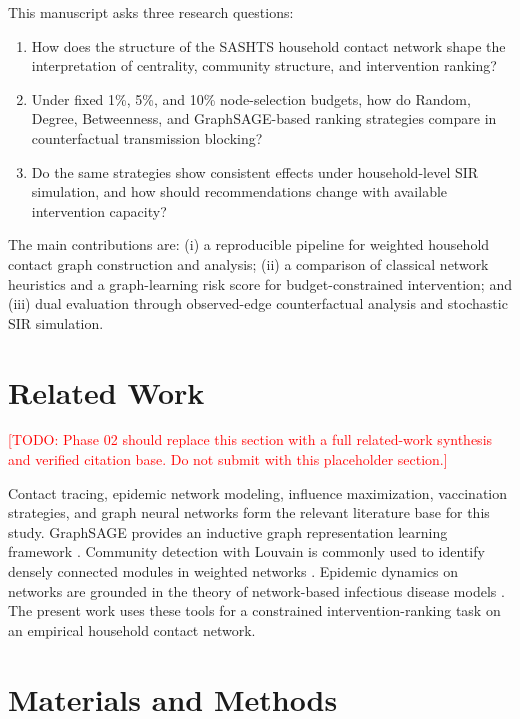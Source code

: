 \documentclass[11pt,a4paper]{article}
\newcommand{\TODO}[1]{\textcolor{red}{[TODO: #1]}}
\begin{document}
This manuscript asks three research questions:

\begin{enumerate}
  \item How does the structure of the SASHTS household contact network shape the interpretation of centrality, community structure, and intervention ranking?
  \item Under fixed 1\%, 5\%, and 10\% node-selection budgets, how do Random, Degree, Betweenness, and GraphSAGE-based ranking strategies compare in counterfactual transmission blocking?
  \item Do the same strategies show consistent effects under household-level SIR simulation, and how should recommendations change with available intervention capacity?
\end{enumerate}

The main contributions are: (i) a reproducible pipeline for weighted household contact graph construction and analysis; (ii) a comparison of classical network heuristics and a graph-learning risk score for budget-constrained intervention; and (iii) dual evaluation through observed-edge counterfactual analysis and stochastic SIR simulation.

\section{Related Work}

\TODO{Phase 02 should replace this section with a full related-work synthesis and verified citation base. Do not submit with this placeholder section.}

Contact tracing, epidemic network modeling, influence maximization, vaccination strategies, and graph neural networks form the relevant literature base for this study. GraphSAGE provides an inductive graph representation learning framework \cite{hamilton2017graphsage}. Community detection with Louvain is commonly used to identify densely connected modules in weighted networks \cite{blondel2008louvain}. Epidemic dynamics on networks are grounded in the theory of network-based infectious disease models \cite{kiss2017epidemics,keeling2005networks}. The present work uses these tools for a constrained intervention-ranking task on an empirical household contact network.

\section{Materials and Methods}
\end{document}
